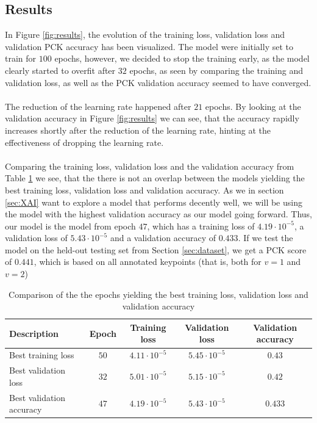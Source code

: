\documentclass[./main.tex]{subfiles}
\begin{document}
\subsection{Results}\label{subsec:results}
In Figure \ref{fig:results}, the evolution of the training loss, validation loss and validation PCK accuracy has been visualized. The model were initially set to train for $100$ epochs, however, we decided to stop the training early, as the model clearly started to overfit after $32$ epochs, as seen by comparing the training and validation loss, as well as the PCK validation accuracy seemed to have converged.
\\
\\
The reduction of the learning rate happened after $21$ epochs. By looking at the validation accuracy in Figure \ref{fig:results} we can see, that the accuracy rapidly increases shortly after the reduction of the learning rate, hinting at the effectiveness of dropping the learning rate. 
\\
\\
Comparing the training loss, validation loss and the validation accuracy from Table \ref{tab:results} we see, that the there is not an overlap between the models yielding the best training loss, validation loss and validation accuracy. As we in section \ref{sec:XAI} want to explore a model that performs decently well, we will be using the model with the highest validation accuracy as our model going forward. Thus, our model is the model from epoch $47$, which has a training loss of $4.19 \cdot 10^{-5}$, a validation loss of $5.43 \cdot 10^{-5}$ and a validation accuracy of $0.433$. If we test the model on the held-out testing set from Section \ref{sec:dataset}, we get a PCK score of $0.441$, which is based on all annotated keypoints (that is, both for $v = 1$ and $v = 2$)
\begin{table}[b]
    \centering
    \begin{tabular}{|l|c|c|c|c|}
        \hline
        \textbf{Description} & \textbf{Epoch} & \textbf{Training loss} & \textbf{Validation loss} & \textbf{Validation accuracy} \\
        \hline
        Best training loss & $50$ & $4.11 \cdot 10^{-5}$ & $5.45 \cdot 10^{-5}$ & $0.43$ \\
        \hline
        Best validation loss & $32$ & $5.01 \cdot 10^{-5}$ & $5.15 \cdot 10^{-5}$ & $0.42$ \\
        \hline
        Best validation accuracy & $47$ & $4.19 \cdot 10^{-5}$ & $5.43 \cdot 10^{-5}$  & $0.433$ \\
        \hline
    \end{tabular}
    \caption{Comparison of the the epochs yielding the best training loss, validation loss and validation accuracy}
    \label{tab:results}
\end{table}
\end{document}
